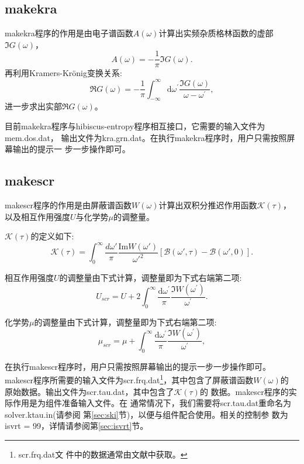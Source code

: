 \subsection{makekra}
makekra程序的作用是由电子谱函数$A(\omega)$计算出实频杂质格林函数的虚部
$\Im G(\omega)$，
\begin{equation}
\label{eq:a_img}
A(\omega) = -\frac{1}{\pi}\Im G(\omega).
\end{equation}
再利用Kramers-Kr\"{o}nig变换关系:
\begin{equation}
\Re G(\omega) = -\frac{1}{\pi} \int^{\infty}_{-\infty} \text{d}\omega^{\prime} 
\frac{\Im G (\omega)}{\omega - \omega^{\prime}},
\end{equation}
进一步求出实部$\Re G(\omega)$。

目前makekra程序与hibiscus-entropy程序相互接口，它需要的输入文件为mem.dos.dat，
输出文件为kra.grn.dat。在执行makekra程序时，用户只需按照屏幕输出的提示一
步一步操作即可。

\subsection{makescr}
makescr程序的作用是由屏蔽谱函数$W(\omega)$计算出双积分推迟作用函数$\mathcal{K}(\tau)$，
以及相互作用强度$U$与化学势$\mu$的调整量。

$\mathcal{K}(\tau)$的定义如下\cite{werner:2010}:
\begin{equation}
\label{eq:k_tau}
\mathcal{K}(\tau) = \int^{\infty}_{0} \frac{d\omega'}{\pi} \frac{\text{Im} W(\omega')}{\omega'^{2}}
\left[\mathcal{B}(\omega',\tau) - \mathcal{B}(\omega',0)\right].
\end{equation}

相互作用强度$U$的调整量由下式计算，调整量即为下式右端第二项:
\begin{equation}
U_{scr} = U + 2\int^{\infty}_{0} \frac{\text{d}\omega^{\prime}}{\pi} \frac{\Im{W(\omega^{\prime})}}{\omega^{\prime}}.
\end{equation}

化学势$\mu$的调整量由下式计算，调整量即为下式右端第二项:
\begin{equation}
\mu_{scr} = \mu + \int^{\infty}_{0} \frac{\text{d}\omega^{\prime}}{\pi} \frac{\Im {W(\omega^{\prime})}}{\omega^{\prime}},
\end{equation}

在执行makescr程序时，用户只需按照屏幕输出的提示一步一步操作即可。
makescr程序所需要的输入文件为scr.frq.dat\footnote{scr.frq.dat文
件中的数据通常由文献中获取。}，其中包含了屏蔽谱函数$W(\omega)$的
原始数据。输出文件为scr.tau.dat，其中包含了$\mathcal{K}(\tau)$的
数据。makescr程序的实际作用是为{\narcissus}组件准备输入文件。在
通常情况下，我们需要将scr.tau.dat重命名为solver.ktau.in(请参阅
第\ref{sec:ski}节)，以便与{\narcissus}组件配合使用。相关的控制参
数为isvrt = 99，详情请参阅第\ref{sec:isvrt}节。

